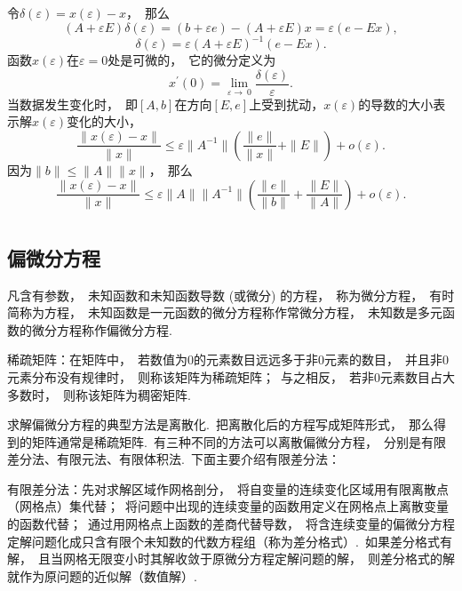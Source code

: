 \documentclass{article}
\begin{document}
令$\delta (\varepsilon)=x(\varepsilon)-x$，~那么
$$(A+\varepsilon E)\delta (\varepsilon)=(b+\varepsilon e)-(A+\varepsilon E)x=\varepsilon (e-Ex),$$
$$\delta (\varepsilon)=\varepsilon (A+\varepsilon E)^{-1}(e-Ex).$$
函数$x(\varepsilon)$在$\varepsilon =0$处是可微的，~它的微分定义为$$x^\prime (0)=\lim_{\varepsilon \to\ 0}\frac{\delta (\varepsilon)}{\varepsilon}.$$
当数据发生变化时，~即$[A,b]$在方向$[E,e]$上受到扰动，$x(\varepsilon)$的导数的大小表示解$x(\varepsilon)$变化的大小，
$$\frac{\parallel x(\varepsilon)-x\parallel}{\parallel x\parallel}\le\varepsilon\parallel A^{-1}\parallel(\frac{\parallel e\parallel}{\parallel x\parallel}+\parallel E\parallel)+o(\varepsilon).$$
因为$\parallel b\parallel\le\parallel A\parallel\parallel x\parallel$，~那么
$$\frac{\parallel x(\varepsilon)-x\parallel}{\parallel x\parallel}\le\varepsilon\parallel A\parallel\parallel A^{-1}\parallel(\frac{\parallel e\parallel}{\parallel b\parallel}+\frac{\parallel E\parallel}{\parallel A\parallel})+o(\varepsilon).$$











\section{}
\subsection{偏微分方程}

 凡含有参数，~未知函数和未知函数导数 (或微分) 的方程，~称为微分方程，~有时简称为方程，~未知函数是一元函数的微分方程称作常微分方程，~未知数是多元函数的微分方程称作偏微分方程.

稀疏矩阵：在矩阵中，~若数值为$0$的元素数目远远多于非$0$元素的数目，~并且非$0$元素分布没有规律时，~则称该矩阵为稀疏矩阵；~与之相反，~若非$0$元素数目占大多数时，~则称该矩阵为稠密矩阵.

求解偏微分方程的典型方法是离散化.~把离散化后的方程写成矩阵形式，~那么得到的矩阵通常是稀疏矩阵.~有三种不同的方法可以离散偏微分方程，~分别是有限差分法、有限元法、有限体积法.~下面主要介绍有限差分法：

有限差分法：先对求解区域作网格剖分，~将自变量的连续变化区域用有限离散点（网格点）集代替；~将问题中出现的连续变量的函数用定义在网格点上离散变量的函数代替；~通过用网格点上函数的差商代替导数，~将含连续变量的偏微分方程定解问题化成只含有限个未知数的代数方程组（称为差分格式）.~如果差分格式有解，~且当网格无限变小时其解收敛于原微分方程定解问题的解，~则差分格式的解就作为原问题的近似解（数值解）.
\end{document}
